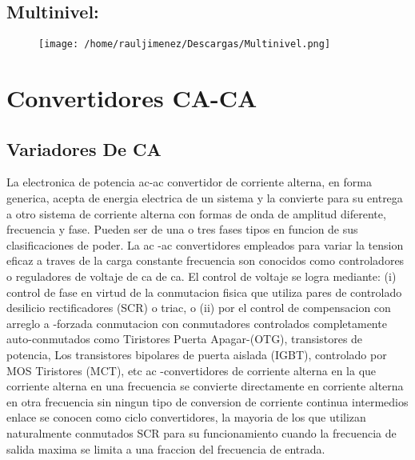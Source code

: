 \documentclass[11pt]{article}
\begin{document}
\subsection{Multinivel:}
\begin{figure}[htp]
\centering
\texttt{[image: /home/rauljimenez/Descargas/Multinivel.png]}
\caption{}
\label{}
\end{figure}
\section{Convertidores CA-CA}
\subsection{Variadores De CA}
La  electronica de potencia ac-ac convertidor de corriente alterna, en forma generica, acepta de energia electrica de un sistema y la convierte para su entrega a otro sistema de corriente alterna con formas de onda de amplitud diferente, frecuencia y fase. Pueden ser de una o tres fases tipos en funcion de sus clasificaciones de poder. La ac -ac convertidores empleados para variar la tension eficaz a traves de la carga constante frecuencia son conocidos como  controladores  o  reguladores  de  voltaje  de  ca de  ca.  El  control  de  voltaje  se  logra  mediante:  (i)  control  de fase en virtud de la conmutacion fisica que utiliza pares de controlado desilicio rectificadores (SCR) o triac, o (ii) por   el   control de   compensacion   con   arreglo   a -forzada   conmutacion   con   conmutadores   controlados completamente auto-conmutados como Tiristores Puerta Apagar-(OTG), transistores de potencia, Los transistores bipolares  de  puerta  aislada  (IGBT),  controlado  por  MOS  Tiristores  (MCT),  etc   ac -convertidores  de  corriente alterna  en  la  que  corriente  alterna  en  una  frecuencia  se  convierte  directamente  en  corriente  alterna  en  otra frecuencia  sin  ningun  tipo  de  conversion de  corriente  continua  intermedios  enlace  se  conocen  como  ciclo convertidores,  la  mayoria  de  los  que  utilizan  naturalmente  conmutados  SCR  para  su  funcionamiento  cuando  la frecuencia de salida maxima se limita a una fraccion del frecuencia de entrada. 
\end{document}
